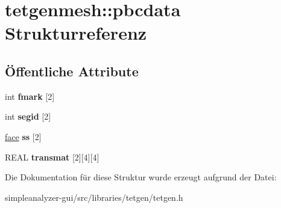 \hypertarget{structtetgenmesh_1_1pbcdata}{\section{tetgenmesh\-:\-:pbcdata Strukturreferenz}
\label{structtetgenmesh_1_1pbcdata}
}
\subsection*{Öffentliche Attribute}
\begin{DoxyCompactItemize}
\item 
\hypertarget{structtetgenmesh_1_1pbcdata_acc1dd0bfcf936c441db8ccca8a1c5a3e}{int {\bfseries fmark} \mbox{[}2\mbox{]}}\label{structtetgenmesh_1_1pbcdata_acc1dd0bfcf936c441db8ccca8a1c5a3e}

\item 
\hypertarget{structtetgenmesh_1_1pbcdata_aa4941205a4c69e9713e03655b57fff41}{int {\bfseries segid} \mbox{[}2\mbox{]}}\label{structtetgenmesh_1_1pbcdata_aa4941205a4c69e9713e03655b57fff41}

\item 
\hypertarget{structtetgenmesh_1_1pbcdata_ac3b5a295b2e682dc5f721f65c92826f4}{\hyperlink{classtetgenmesh_1_1face}{face} {\bfseries ss} \mbox{[}2\mbox{]}}\label{structtetgenmesh_1_1pbcdata_ac3b5a295b2e682dc5f721f65c92826f4}

\item 
\hypertarget{structtetgenmesh_1_1pbcdata_a7e7594665d51a5e4eb5752b8946fe229}{R\-E\-A\-L {\bfseries transmat} \mbox{[}2\mbox{]}\mbox{[}4\mbox{]}\mbox{[}4\mbox{]}}\label{structtetgenmesh_1_1pbcdata_a7e7594665d51a5e4eb5752b8946fe229}

\end{DoxyCompactItemize}


Die Dokumentation für diese Struktur wurde erzeugt aufgrund der Datei\-:\begin{DoxyCompactItemize}
\item 
simpleanalyzer-\/gui/src/libraries/tetgen/tetgen.\-h\end{DoxyCompactItemize}
